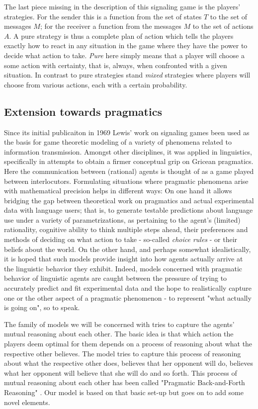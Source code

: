\documentclass[10]{article}
\begin{document}
The last piece missing in the description of this signaling game is the players' strategies. For the sender this is a function from the set of states $T$ to the set of messages $M$; for the receiver a function from the messages $M$ to the set of actions $A$. A pure strategy is thus a complete plan of action which tells the players exactly how to react in any situation in the game where they have the power to decide what action to take. \textit{Pure} here simply means that a player will choose a some action with certainty, that is, always, when confronted with a given situation. In contrast to pure strategies stand \textit{mixed} strategies where players will choose from various actions, each with a certain probability.


\subsection{Extension towards pragmatics}
Since its initial publicaiton in 1969 Lewis' work on signaling games been used as the basis for game theoretic modeling of a variety of phenomena related to information transmission. Amongst other disciplines, it was applied in linguistics, specifically in attempts to obtain a firmer conceptual grip on Gricean pragmatics. Here the communication between (rational) agents is thought of as a game played between interlocutors. Formulating situations where pragmatic phenomena arise with mathematical precision helps in different ways: On one hand it allows bridging the gap between theoretical work on pragmatics and actual experimental data with language users; that is, to generate testable predictions about language use under a variety of parametrizations, as pertaining to the agent's (limited) rationality, cognitive ability to think multiple steps ahead, their preferences and methods of deciding on what action to take - so-called \textit{choice rules} - or their beliefs about the world. On the other hand, and perhaps somewhat idealistically, it is hoped that such models provide insight into how agents actually arrive at the linguistic behavior they exhibit. Indeed, models concerned with pragmatic behavior of linguistic agents are caught between the pressure of trying to accurately predict and fit experimental data and the hope to realistically capture one or the other aspect of a pragmatic phenomenon - to represent "what actually is going on", so to speak.

The family of models we will be concerned with tries to capture the agents' mutual reasoning about each other. The basic idea is that which action the players deem optimal for them depends on a process of reasoning about what the respective other believes. The model tries to capture this process of reasoning about what the respective other does, believes that her opponent will do, believes what her opponent will believe that she will do and so forth. This process of mutual reasoning about each other has been called "Pragmatic Back-and-Forth Reasoning" \cite{franke2014pragmatic}. Our model is based on that basic set-up but goes on to add some novel elements.
\end{document}
